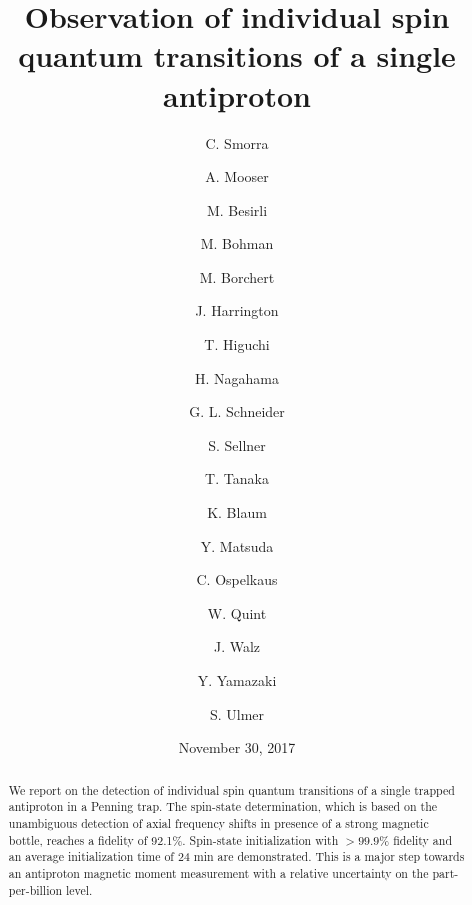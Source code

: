 \documentclass[preprint%
]{elsarticle}
\begin{document}
\title{Observation of individual spin quantum transitions of a single antiproton}%

\begin{abstract}
We report on the detection of individual spin quantum transitions of a single trapped antiproton in a Penning trap. The spin-state determination, which is based on the unambiguous detection of axial frequency shifts in presence of a strong magnetic bottle, reaches a fidelity of 92.1$\%$. Spin-state initialization with $>99.9\%$ fidelity and an average initialization time of 24 min are demonstrated. This is a major step towards an antiproton magnetic moment measurement with a relative uncertainty on the part-per-billion level.
\end{abstract}

\author[riken,cern]{C. Smorra}
\author[riken]{A. Mooser}
\author[riken]{M. Besirli}
\author[riken,mpik]{M. Bohman}
\author[riken,iqo]{M. Borchert}
\author[mpik]{J. Harrington} 
\author[riken,ut]{T. Higuchi}
\author[riken,ut]{H. Nagahama}
\author[iphm]{G. L. Schneider}
\author[riken]{S. Sellner}
\author[riken,ut]{T. Tanaka}
\author[mpik]{K. Blaum}
\author[ut]{Y. Matsuda}
\author[iqo,ptb]{C. Ospelkaus}
\author[gsi]{W. Quint}
\author[iphm,him]{J. Walz}
\author[aplriken]{Y. Yamazaki}
\author[riken]{S. Ulmer}

\address[riken]{Ulmer Initiative Research Unit, RIKEN, 2-1 Hirosawa, Wako, Saitama 351-0198, Japan}
\address[cern]{CERN, CH-1211 Geneva 23, Switzerland}
\address[mpik]{Max-Planck-Institut f\"ur Kernphysik, Saupfercheckweg 1, D-69117 Heidelberg, Germany}
\address[iqo]{Institute of Quantum Optics, Leibniz Universit\"at Hannover, Welfengarten 1, D-30167 Hannover, Germany}
\address[ut]{Graduate School of Arts and Sciences, University of Tokyo, 3-8-1 Komaba, Meguro-ku, Tokyo 153-8902, Japan}
\address[iphm]{Institut f\"ur Physik, Johannes Gutenberg-Universit\"at Mainz, D-55099 Mainz, Germany}
\address[ptb]{Physikalisch-Technische Bundesanstalt, Bundesallee 100, D-38116 Braunschweig, Germany}
\address[gsi]{GSI-Helmholtzzentrum f\"ur Schwerionenforschung, D-64291 Darmstadt, Germany}
\address[uhd]{Ruprecht-Karls-Universit\"at Heidelberg, D-69047 Heidelberg, Germany}
\address[him]{Helmholtz-Institut Mainz, D-55099 Mainz, Germany}
\address[aplriken]{Atomic Physics Laboratory, RIKEN, 2-1 Hirosawa, Wako, Saitama 351-0198, Japan}
\date{November 30, 2017}%
\maketitle
\end{document}
